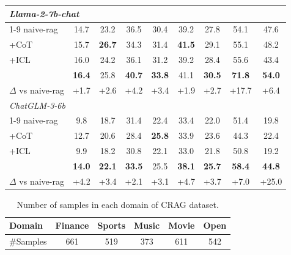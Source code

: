 \documentclass{article}
\newcommand{\ourmethod}{{\fontfamily{lmtt}\selectfont \textbf{TTARAG}}\xspace}
\begin{document}
\begin{table}[t]
\begin{tabular}{@{}lcccccccc@{}}
    \multicolumn{9}{l}{\textit{Llama-2-7b-chat}} \\
    \cmidrule(l){1-9}
    naive-rag & 14.7 & 23.2 & 36.5 & 30.4 & 39.2 & 27.8 & 54.1 & 47.6 \\
    +CoT & 15.7 & \textbf{26.7} & 34.3 & 31.4 & \textbf{41.5} & 29.1 & 55.1 & 48.2 \\
    +ICL & 16.0 & 24.2 & 36.1 & 31.2 & 39.2 & 28.4 & 55.6 & 43.4 \\
    \rowcolor{gray!20}\ourmethod & \textbf{16.4} & 25.8 & \textbf{40.7} & \textbf{33.8} & 41.1 & \textbf{30.5} & \textbf{71.8} & \textbf{54.0} \\
    \rowcolor{gray!20}$\Delta$ vs naive-rag & +1.7 & +2.6 & +4.2 & +3.4 & +1.9 & +2.7 & +17.7 & +6.4 \\
    \midrule
    \multicolumn{9}{l}{\textit{ChatGLM-3-6b}} \\
    \cmidrule(l){1-9}
    naive-rag & 9.8 & 18.7 & 31.4 & 22.4 & 33.4 & 22.0 & 51.4 & 19.8 \\
    +CoT & 12.7 & 20.6 & 28.4 & \textbf{25.8} & 33.9 & 23.6 & 44.3 & 22.4 \\
    +ICL & 9.9 & 18.2 & 30.8 & 22.1 & 33.0 & 21.8 & 50.8 & 19.2 \\
    \rowcolor{gray!20}\ourmethod & \textbf{14.0} & \textbf{22.1} & \textbf{33.5} & 25.5 & \textbf{38.1} & \textbf{25.7} & \textbf{58.4} & \textbf{44.8} \\
    \rowcolor{gray!20}$\Delta$ vs naive-rag & +4.2 & +3.4 & +2.1 & +3.1 & +4.7 & +3.7 & +7.0 & +25.0 \\
    \bottomrule
    \end{tabular}
    \end{table} 





    \begin{table}[h]
        \centering
        \caption{Number of samples in each domain of CRAG dataset.}
        \label{tab:dataset_stats}
        \begin{tabular}{lccccc}
        \toprule
        \textbf{Domain} & Finance & Sports & Music & Movie & Open \\
        \midrule
        \#Samples & 661 & 519 & 373 & 611 & 542 \\
        \bottomrule
        \end{tabular}
        \end{table}   
\end{document}
